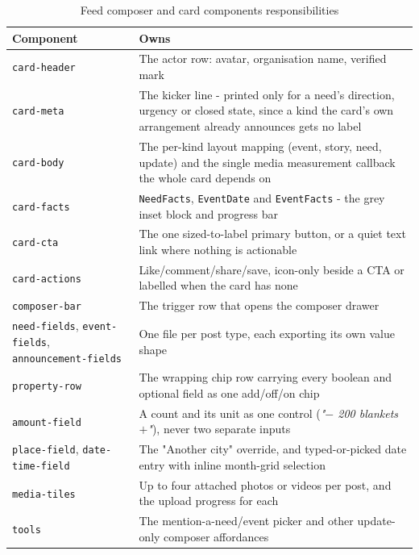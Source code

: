 \begin{table}[H]\centering
\caption{Feed composer and card components responsibilities}
\label{tab:ui-components}
\begin{tabularx}{\textwidth}{|p{}|Y|}
\hline
\textbf{Component} & \textbf{Owns}\\\hline
\texttt{card-header} & The actor row: avatar, organisation name, verified mark\\\hline
\texttt{card-meta} & The kicker line - printed only for a need's direction, urgency or closed state, since a kind the card's own arrangement already announces gets no label\\\hline
\texttt{card-body} & The per-kind layout mapping (event, story, need, update) and the single media measurement callback the whole card depends on\\\hline
\texttt{card-facts} & \texttt{NeedFacts}, \texttt{EventDate} and \texttt{EventFacts} - the grey inset block and progress bar\\\hline
\texttt{card-cta} & The one sized-to-label primary button, or a quiet text link where nothing is actionable\\\hline
\texttt{card-actions} & Like/comment/share/save, icon-only beside a CTA or labelled when the card has none\\\hline
\texttt{composer-bar} & The trigger row that opens the composer drawer\\\hline
\texttt{need-fields}, \texttt{event-fields}, \texttt{announcement-fields} & One file per post type, each exporting its own value shape\\\hline
\texttt{property-row} & The wrapping chip row carrying every boolean and optional field as one add/off/on chip\\\hline
\texttt{amount-field} & A count and its unit as one control (\emph{"$-$ 200 blankets $+$"}), never two separate inputs\\\hline
\texttt{place-field}, \texttt{date-time-field} & The "Another city" override, and typed-or-picked date entry with inline month-grid selection\\\hline
\texttt{media-tiles} & Up to four attached photos or videos per post, and the upload progress for each\\\hline
\texttt{tools} & The mention-a-need/event picker and other update-only composer affordances\\\hline
\end{tabularx}
\end{table}

